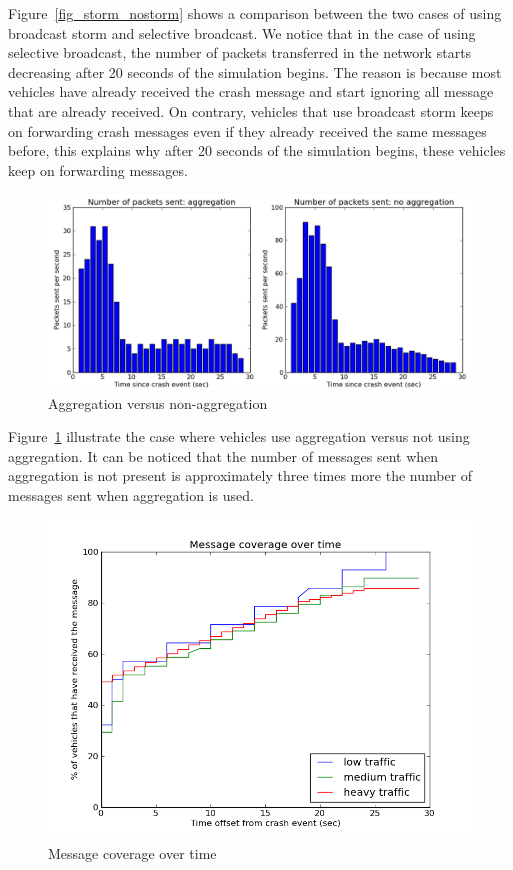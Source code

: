 \documentclass{IEEEtran}
\begin{document}
Figure~\ref{fig_storm_nostorm} shows a comparison between the two cases of using broadcast storm and selective broadcast. We notice that in the case of using selective broadcast, the number of packets transferred in the network starts decreasing after 20 seconds of the simulation begins. The reason is because most vehicles have already received the crash message and start ignoring all message that are already received. On contrary, vehicles that use broadcast storm keeps on forwarding crash messages even if they already received the same messages before, this explains why after 20 seconds of the simulation begins, these vehicles keep on forwarding messages.

\noindent
\begin{figure}[h]
\centering
\includegraphics[scale=0.32]{Figure_02.png}
\caption{Aggregation versus non-aggregation}
\label{fig_aggregation_nonaggregation}
\end{figure}

Figure~\ref{fig_aggregation_nonaggregation} illustrate the case where vehicles use aggregation versus not using aggregation. It can be noticed that the number of messages sent when aggregation is not present is approximately three times more the number of messages sent when aggregation is used.

\noindent
\begin{figure}[h]
\centering
\includegraphics[scale=0.45]{Figure_03.png}
\caption{Message coverage over time}
\label{fig_msg_coverage}
\end{figure}
\end{document}
